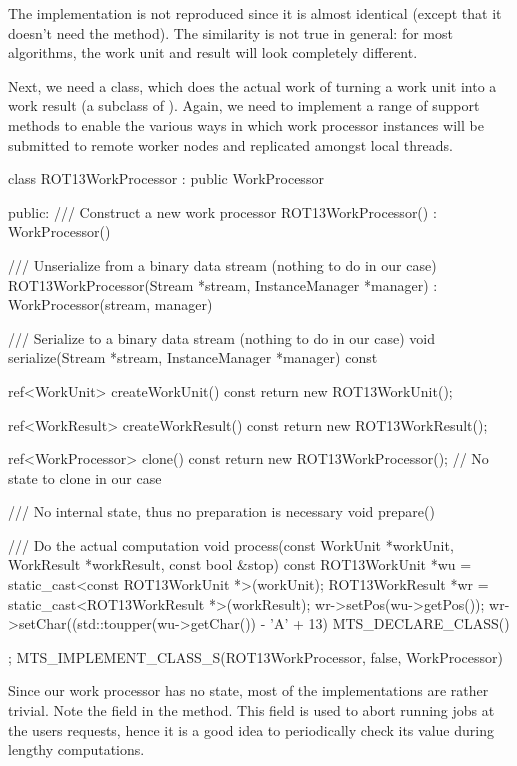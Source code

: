 The  implementation is not reproduced since it is almost identical
(except that it doesn't need the  method).
The similarity is not true in general: for most algorithms, the work unit and result
will look completely different.

Next, we need a class, which does the actual work of turning a work unit into a work result
(a subclass of ). Again, we need to implement a range of support
methods to enable the various ways in which work processor instances will be submitted to
remote worker nodes and replicated amongst local threads.
\begin{cpp}
class ROT13WorkProcessor : public WorkProcessor {
public:
    /// Construct a new work processor
    ROT13WorkProcessor() : WorkProcessor() { }

    /// Unserialize from a binary data stream (nothing to do in our case)
    ROT13WorkProcessor(Stream *stream, InstanceManager *manager)
        : WorkProcessor(stream, manager) { }

    /// Serialize to a binary data stream (nothing to do in our case)
    void serialize(Stream *stream, InstanceManager *manager) const {
    }

    ref<WorkUnit> createWorkUnit() const {
        return new ROT13WorkUnit();
    }

    ref<WorkResult> createWorkResult() const {
        return new ROT13WorkResult();
    }

    ref<WorkProcessor> clone() const {
        return new ROT13WorkProcessor(); // No state to clone in our case
    }

    /// No internal state, thus no preparation is necessary
    void prepare() { }

    /// Do the actual computation
    void process(const WorkUnit *workUnit, WorkResult *workResult,
                 const bool &stop) {
        const ROT13WorkUnit *wu
            = static_cast<const ROT13WorkUnit *>(workUnit);
        ROT13WorkResult *wr = static_cast<ROT13WorkResult *>(workResult);
        wr->setPos(wu->getPos());
        wr->setChar((std::toupper(wu->getChar()) - 'A' + 13) %
    }
    MTS_DECLARE_CLASS()
};
MTS_IMPLEMENT_CLASS_S(ROT13WorkProcessor, false, WorkProcessor)
\end{cpp}
Since our work processor has no state, most of the implementations
are rather trivial. Note the  field in the 
method. This field is used to abort running jobs at the users requests, hence
it is a good idea to periodically check its value during lengthy computations.

